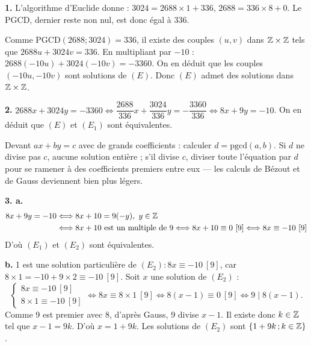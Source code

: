 \documentclass[11pt]{article}
\begin{document}


\textbf{1.} L'algorithme d'Euclide donne : $3024 = 2688 \times 1 + 336$, $2688 = 336 \times 8 + 0$. Le PGCD, dernier reste non nul, est donc égal à 336.

Comme $\mathrm{PGCD}(2688;3024) = 336$, il existe des couples $(u, v)$ dans $\mathbb{Z} \times \mathbb{Z}$ tels que $2688u + 3024v = 336$. En multipliant par $-10$ : $2688(-10u) + 3024(-10v) = -3360$. On en déduit que les couples $(-10u, -10v)$ sont solutions de $(E)$. Donc $(E)$ admet des solutions dans $\mathbb{Z} \times \mathbb{Z}$.

\textbf{2.} $2688x + 3024y = -3360 \Longleftrightarrow \dfrac{2688}{336}x + \dfrac{3024}{336}y = -\dfrac{3360}{336} \Longleftrightarrow 8x + 9y = -10$. On en déduit que $(E)$ et $(E_1)$ sont équivalentes.

\begin{methode}
Devant $ax + by = c$ avec de grands coefficients : calculer
$d = \mathrm{pgcd}(a, b)$. Si $d$ ne divise pas $c$, aucune solution
entière ; s'il divise $c$, diviser toute l'équation par $d$ pour se
ramener à des coefficients premiers entre eux — les calculs de Bézout
et de Gauss deviennent bien plus légers.
\end{methode}

\textbf{3. a.}
\begin{align*}
8x + 9y = -10 &\Longleftrightarrow 8x + 10 = 9(-y),\ y \in \mathbb{Z} \\
&\Longleftrightarrow 8x + 10 \text{ est un multiple de } 9 \Longleftrightarrow 8x + 10 \equiv 0\ [9] \Longleftrightarrow 8x \equiv -10\ [9]
\end{align*}
D'où $(E_1)$ et $(E_2)$ sont équivalentes.

\textbf{b.} 1 est une solution particulière de $(E_2) : 8x \equiv -10\ [9]$, car $8 \times 1 = -10 + 9 \times 2 \equiv -10\ [9]$. Soit $x$ une solution de $(E_2)$ :
\[ \begin{cases} 8x \equiv -10\ [9] \\ 8 \times 1 \equiv -10\ [9] \end{cases} \Longleftrightarrow 8x \equiv 8 \times 1\ [9] \Longleftrightarrow 8(x - 1) \equiv 0\ [9] \Longleftrightarrow 9 \mid 8(x - 1). \]
Comme 9 est premier avec 8, d'après Gauss, 9 divise $x - 1$. Il existe donc $k \in \mathbb{Z}$ tel que $x - 1 = 9k$. D'où $x = 1 + 9k$. Les solutions de $(E_2)$ sont $\{1 + 9k\,;k \in \mathbb{Z}\}$.
\end{document}
